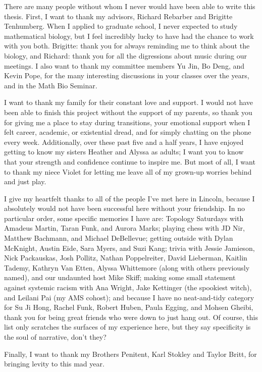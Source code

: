 \documentclass[final]{nuthesis}
\theoremstyle{definition}
\numberwithin{theorem}{section}
\numberwithin{lemma}{section}
\numberwithin{corollary}{section}
\numberwithin{definition}{section}
\numberwithin{equation}{section}
\begin{document}
\begin{acknowledgments}
	There are many people without whom I never would have been able to write this thesis. First, I want to thank my advisors, Richard Rebarber and Brigitte Tenhumberg. When I applied to graduate school, I never expected to study mathematical biology, but I feel incredibly lucky to have had the chance to work with you both. Brigitte: thank you for always reminding me to think about the biology, and Richard: thank you for all the digressions about music during our meetings. I also want to thank my committee members Yu Jin, Bo Deng, and Kevin Pope, for the many interesting discussions in your classes over the years, and in the Math Bio Seminar.
	
	I want to thank my family for their constant love and support. I would not have been able to finish this project without the support of my parents, so thank you for giving me a place to stay during transitions, your emotional support when I felt career, academic, or existential dread, and for simply chatting on the phone every week. Additionally, over these past five and a half years, I have enjoyed getting to know my sisters Heather and Alyssa as adults; I want you to know that your strength and confidence continue to inspire me. But most of all, I want to thank my niece Violet for letting me leave all of my grown-up worries behind and just play.
	
	I give my heartfelt thanks to all of the people I've met here in Lincoln, because I absolutely would not have been successful here without your friendship. In no particular order, some specific memories I have are: Topology Saturdays with Amadeus Martin, Taran Funk, and Aurora Marks; playing chess with JD Nir, Matthew Bachmann, and Michael DeBellevue; getting outside with Dylan McKnight, Austin Eide, Sara Myers, and Suzi Kang; trivia with Jessie Jamieson, Nick Packauskas, Josh Pollitz, Nathan Poppelreiter, David Lieberman, Kaitlin Tademy, Kathryn Van Etten, Alyssa Whittemore (along with others previously named), and our undaunted host Mike Skiff; making some small statement against systemic racism with Ana Wright, Jake Kettinger (the spookiest witch), and Leilani Pai (my AMS cohost); and because I have no neat-and-tidy category for Su Ji Hong, Rachel Funk, Robert Huben, Paula Egging, and Mohsen Gheibi, thank you for being great friends who were down to just hang out. Of course, this list only scratches the surfaces of my experience here, but they say specificity is the soul of narrative, don't they?
	
	Finally, I want to thank my Brothers Penitent, Karl Stokley and Taylor Britt, for bringing levity to this mad year.
\end{acknowledgments}
\end{document}
